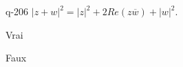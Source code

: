 \begin{truefalse}{q-206}
$|z+w|^2= |z|^2+2Re(z\overline w)+|w|^2$.
\item* Vrai
\item Faux
\end{truefalse}

